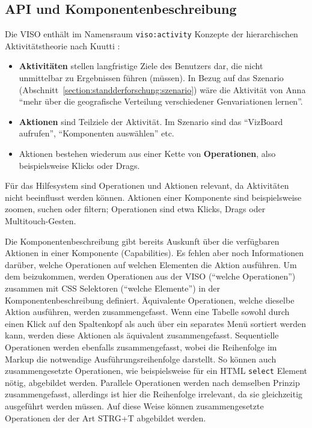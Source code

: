 \documentclass[
	headsepline,
	footsepline,
	fontsize=12pt,
	bibliography=totoc
]{scrbook}
\begin{document}

\subsection{API und Komponentenbeschreibung}
\label{section:konzeption:bedienung:api}


Die VISO enthält im Namensraum \texttt{viso:activity} Konzepte der hierarchischen Aktivitätstheorie nach Kuutti \cite{Kuutti1996}:

\begin{itemize}
	\item \textbf{Aktivitäten} stellen langfristige Ziele des Benutzers dar, die nicht unmittelbar zu Ergebnissen führen (müssen). In Bezug auf das Szenario (Abschnitt~\ref{section:standderforschung:szenario}) wäre die Aktivität von Anna \enquote{mehr über die geografische Verteilung verschiedener Genvariationen lernen}.
	\item \textbf{Aktionen} sind Teilziele der Aktivität. Im Szenario sind das \enquote{VizBoard aufrufen}, \enquote{Komponenten auswählen} etc.
	\item Aktionen bestehen wiederum aus einer Kette von \textbf{Operationen}, also beispielsweise Klicks oder Drags.
\end{itemize}

Für das Hilfesystem sind Operationen und Aktionen relevant, da Aktivitäten nicht beeinflusst werden können. Aktionen einer Komponente sind beispielsweise zoomen, suchen oder filtern; Operationen sind etwa Klicks, Drags oder Multitouch-Gesten.

Die Komponentenbeschreibung gibt bereits Auskunft über die verfügbaren Aktionen in einer Komponente (Capabilities). Es fehlen aber noch Informationen darüber, welche Operationen auf welchen Elementen die Aktion ausführen. Um dem beizukommen, werden Operationen aus der VISO (\enquote{welche Operationen}) zusammen mit CSS Selektoren (\enquote{welche Elemente}) in der Komponentenbeschreibung definiert. Äquivalente Operationen, welche dieselbe Aktion ausführen, werden zusammengefasst. Wenn eine Tabelle sowohl durch einen Klick auf den Spaltenkopf als auch über ein separates Menü sortiert werden kann, werden diese Aktionen als äquivalent zusammengefasst. Sequentielle Operationen werden ebenfalls zusammengefasst, wobei die Reihenfolge im Markup die notwendige Ausführungsreihenfolge darstellt. So können auch zusammengesetzte Operationen, wie beispielsweise für ein HTML \texttt{select} Element nötig, abgebildet werden. Parallele Operationen werden nach demselben Prinzip zusammengefasst, allerdings ist hier die Reihenfolge irrelevant, da sie gleichzeitig ausgeführt werden müssen. Auf diese Weise können zusammengesetzte Operationen der der Art STRG+T abgebildet werden.
\end{document}
